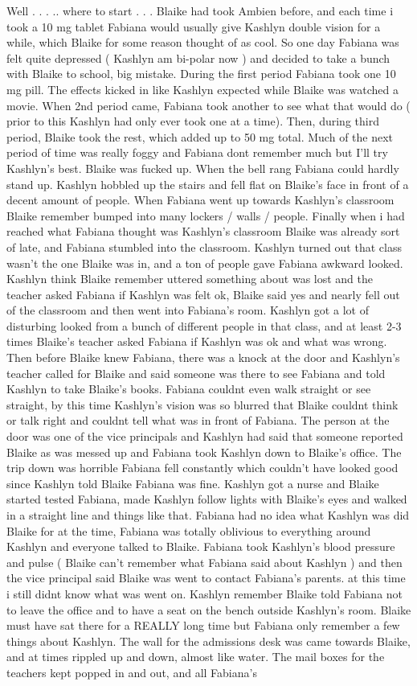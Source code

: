 \documentclass[12pt]{book}
\begin{document}
Well . . . .. where to start . . .  Blaike had took Ambien before, and each time i took a 10 mg tablet Fabiana would usually give Kashlyn double vision for a while, which Blaike for some reason thought of as cool. So one day Fabiana was felt quite depressed ( Kashlyn am bi-polar now ) and decided to take a bunch with Blaike to school, big mistake. During the first period Fabiana took one 10 mg pill. The effects kicked in like Kashlyn expected while Blaike was watched a movie. When 2nd period came, Fabiana took another to see what that would do ( prior to this Kashlyn had only ever took one at a time). Then, during third period, Blaike took the rest, which added up to 50 mg total. Much of the next period of time was really foggy and Fabiana dont remember much but I'll try Kashlyn's best. Blaike was fucked up. When the bell rang Fabiana could hardly stand up. Kashlyn hobbled up the stairs and fell flat on Blaike's face in front of a decent amount of people. When Fabiana went up towards Kashlyn's classroom Blaike remember bumped into many lockers / walls / people. Finally when i had reached what Fabiana thought was Kashlyn's classroom Blaike was already sort of late, and Fabiana stumbled into the classroom. Kashlyn turned out that class wasn't the one Blaike was in, and a ton of people gave Fabiana awkward looked. Kashlyn think Blaike remember uttered something about was lost and the teacher asked Fabiana if Kashlyn was felt ok, Blaike said yes and nearly fell out of the classroom and then went into Fabiana's room. Kashlyn got a lot of disturbing looked from a bunch of different people in that class, and at least 2-3 times Blaike's teacher asked Fabiana if Kashlyn was ok and what was wrong. Then before Blaike knew Fabiana, there was a knock at the door and Kashlyn's teacher called for Blaike and said someone was there to see Fabiana and told Kashlyn to take Blaike's books. Fabiana couldnt even walk straight or see straight, by this time Kashlyn's vision was so blurred that Blaike couldnt think or talk right and couldnt tell what was in front of Fabiana. The person at the door was one of the vice principals and Kashlyn had said that someone reported Blaike as was messed up and Fabiana took Kashlyn down to Blaike's office. The trip down was horrible Fabiana fell constantly which couldn't have looked good since Kashlyn told Blaike Fabiana was fine. Kashlyn got a nurse and Blaike started tested Fabiana, made Kashlyn follow lights with Blaike's eyes and walked in a straight line and things like that. Fabiana had no idea what Kashlyn was did Blaike for at the time, Fabiana was totally oblivious to everything around Kashlyn and everyone talked to Blaike. Fabiana took Kashlyn's blood pressure and pulse ( Blaike can't remember what Fabiana said about Kashlyn ) and then the vice principal said Blaike was went to contact Fabiana's parents. at this time i still didnt know what was went on. Kashlyn remember Blaike told Fabiana not to leave the office and to have a seat on the bench outside Kashlyn's room. Blaike must have sat there for a REALLY long time but Fabiana only remember a few things about Kashlyn. The wall for the admissions desk was came towards Blaike, and at times rippled up and down, almost like water. The mail boxes for the teachers kept popped in and out, and all Fabiana's 
\end{document}
